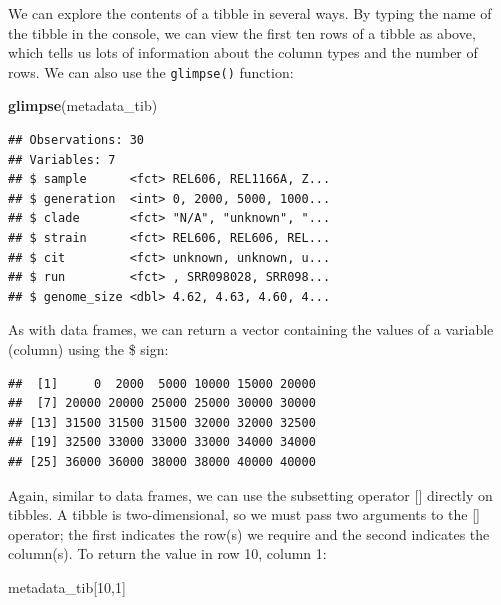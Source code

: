 \documentclass[]{book}
\newenvironment{Shaded}{\begin{snugshade}}{\end{snugshade}}
\newcommand{\DecValTok}[1]{\textcolor[rgb]{0.00,0.00,0.81}{#1}}
\newcommand{\KeywordTok}[1]{\textcolor[rgb]{0.13,0.29,0.53}{\textbf{#1}}}
\newcommand{\NormalTok}[1]{#1}
\newcommand{\OperatorTok}[1]{\textcolor[rgb]{0.81,0.36,0.00}{\textbf{#1}}}
\begin{document}
We can explore the contents of a tibble in several ways. By typing the name of the tibble in the console, we can view the first ten rows of a tibble as above, which tells us lots of information about the column types and the number of rows. We can also use the \texttt{glimpse()} function:

\begin{Shaded}
\begin{Highlighting}[]
\KeywordTok{glimpse}\NormalTok{(metadata_tib)}
\end{Highlighting}
\end{Shaded}

\begin{verbatim}
## Observations: 30
## Variables: 7
## $ sample      <fct> REL606, REL1166A, Z...
## $ generation  <int> 0, 2000, 5000, 1000...
## $ clade       <fct> "N/A", "unknown", "...
## $ strain      <fct> REL606, REL606, REL...
## $ cit         <fct> unknown, unknown, u...
## $ run         <fct> , SRR098028, SRR098...
## $ genome_size <dbl> 4.62, 4.63, 4.60, 4...
\end{verbatim}

As with data frames, we can return a vector containing the values of a variable (column) using the \$ sign:

\begin{Shaded}
\end{Shaded}

\begin{verbatim}
##  [1]     0  2000  5000 10000 15000 20000
##  [7] 20000 20000 25000 25000 30000 30000
## [13] 31500 31500 31500 32000 32000 32500
## [19] 32500 33000 33000 33000 34000 34000
## [25] 36000 36000 38000 38000 40000 40000
\end{verbatim}

Again, similar to data frames, we can use the subsetting operator {[}{]} directly on tibbles. A tibble is two-dimensional, so we must pass two arguments to the {[}{]} operator; the first indicates the row(s) we require and the second indicates the column(s). To return the value in row 10, column 1:

\begin{Shaded}
\begin{Highlighting}[]
\NormalTok{metadata_tib[}\DecValTok{10}\NormalTok{,}\DecValTok{1}\NormalTok{]}
\end{Highlighting}
\end{Shaded}
\end{document}
